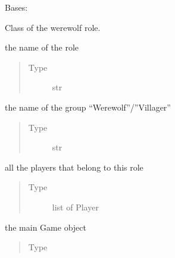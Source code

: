 \documentclass[letterpaper,10pt,english]{sphinxmanual}
\begin{document}
\begin{fulllineitems}
Bases: 

Class of the werewolf role.


\begin{fulllineitems}
the name of the role
\begin{quote}\begin{description}
\item[{Type}] \leavevmode
str

\end{description}\end{quote}

\end{fulllineitems}



\begin{fulllineitems}
the name of the group “Werewolf”/”Villager”
\begin{quote}\begin{description}
\item[{Type}] \leavevmode
str

\end{description}\end{quote}

\end{fulllineitems}



\begin{fulllineitems}
all the players that belong to this role
\begin{quote}\begin{description}
\item[{Type}] \leavevmode
list of Player

\end{description}\end{quote}

\end{fulllineitems}



\begin{fulllineitems}
the main Game object
\begin{quote}\begin{description}
\item[{Type}] \leavevmode
{\hyperref[\detokenize{chatwolf:chatwolf.game.Game}]{}}


\end{description}
\end{quote}
\end{fulllineitems}
\end{fulllineitems}
\end{document}
